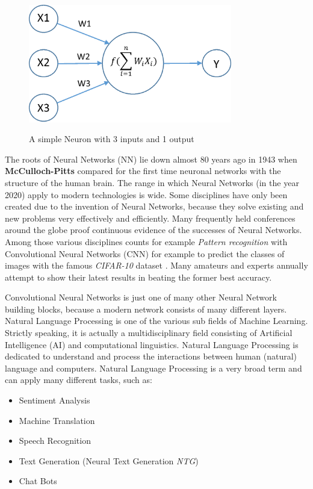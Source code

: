 \begin{figure}
  \begin{center}
  \includegraphics[width=3.5in]{photos/neuron}\\
  \caption{A simple Neuron with 3 inputs and 1 output \cite{neuron}}\label{neuron}
  \end{center}
\end{figure}
 
The roots of Neural Networks (NN) lie down almost 80 years ago in 1943 when \textbf{McCulloch-Pitts} \cite{NN} compared for the first time neuronal networks with the structure of the human brain. The range in which Neural Networks (in the year 2020) apply to modern technologies is wide. Some disciplines have only been created due to the invention of Neural Networks, because they solve existing and new problems very effectively and efficiently. Many frequently held conferences around the globe proof continuous evidence of the successes of Neural Networks. Among those various disciplines counts for example \textit{Pattern recognition} with Convolutional Neural Networks (CNN) \cite{cnn} for example to predict the classes of images with the famous \textit{CIFAR-10} dataset \cite{cifar}. Many amateurs \cite{tim} and experts annually attempt to show their latest results in beating the former best accuracy. 

Convolutional Neural Networks is just one of many other Neural Network building blocks, because a modern network consists of many different layers. Natural Language Processing is one of the various sub fields of Machine Learning. Strictly speaking, it is actually a multidisciplinary field consisting of Artificial Intelligence (AI) and computational linguistics. Natural Language Processing is dedicated to understand and process the interactions between human (natural) language and computers. Natural Language Processing is a very broad term and can apply many different tasks, such as: 

\begin{itemize}
\item Sentiment Analysis
\item Machine Translation
\item Speech Recognition
\item Text Generation (Neural Text Generation \textit{NTG})
\item Chat Bots
\end{itemize}

